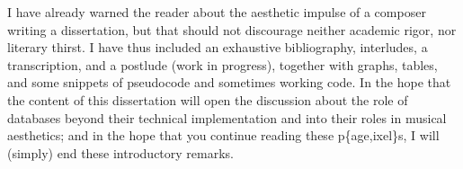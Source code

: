 I have already warned the reader about the aesthetic impulse of a composer writing a dissertation, but that should not discourage neither academic rigor, nor literary thirst. I have thus included an exhaustive bibliography, interludes, a transcription, and a postlude (work in progress), together with graphs, tables, and some snippets of pseudocode and sometimes working code. In the hope that the content of this dissertation will open the discussion about the role of databases beyond their technical implementation and into their roles in musical aesthetics; and in the hope that you continue reading these p\{age,ixel\}s, I will (simply)  end  these introductory remarks.
